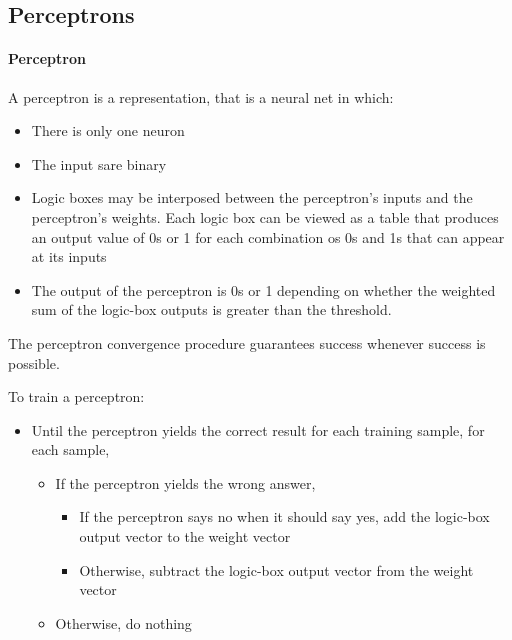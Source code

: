 \documentclass{article}
\begin{document}
\subsection{Perceptrons}

\paragraph{Perceptron} A perceptron is a representation, that is a
neural net in which:
\begin{itemize}
  \item There is only one neuron
  \item The input sare binary
  \item Logic boxes may be interposed between the perceptron's
    inputs and the perceptron's weights. Each logic box can be
    viewed as a table that produces an output value of 0s or 1 for
    each combination os 0s and 1s that can appear at its inputs
  \item The output of the perceptron is 0s or 1 depending on
    whether the weighted sum of the logic-box outputs is greater
    than the threshold.
\end{itemize}

The perceptron convergence procedure guarantees success whenever
success is possible.

To train a perceptron:
\begin{itemize}
  \item Until the perceptron yields the correct result for each
    training sample, for each sample,
    \begin{itemize}
      \item If the perceptron yields the wrong answer,
        \begin{itemize}
          \item If the perceptron says no when it should say yes,
            add the logic-box output vector to the weight vector
          \item Otherwise, subtract the logic-box output vector
            from the weight vector
        \end{itemize}
      \item Otherwise, do nothing
    \end{itemize}
\end{itemize}
\end{document}
